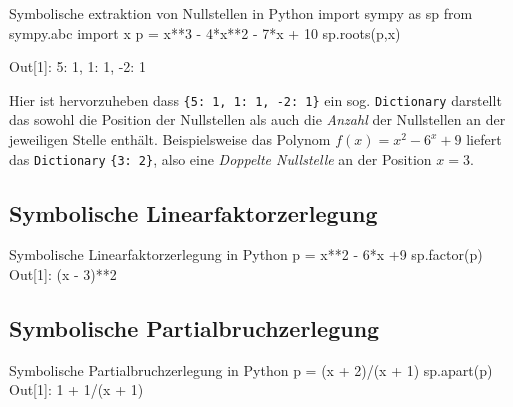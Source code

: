 



\begin{python}{Symbolische extraktion von Nullstellen in Python}
import sympy as sp
from sympy.abc import x
p = x**3 - 4*x**2 - 7*x + 10
sp.roots(p,x)

Out[1]: {5: 1, 1: 1, -2: 1}
\end{python}

Hier ist hervorzuheben dass \texttt{\{5: 1, 1: 1, -2: 1\}} ein sog. \texttt{Dictionary} darstellt das sowohl die Position der Nullstellen als auch die \emph{Anzahl} der Nullstellen an der jeweiligen Stelle enthält. 
Beispielsweise das Polynom $f(x) = x^2 - 6^x + 9$ liefert das \texttt{Dictionary} \texttt{\{3: 2\}}, also eine \emph{Doppelte Nullstelle} an der Position $x=3$. 








\subsection{Symbolische Linearfaktorzerlegung}
\begin{python}{Symbolische Linearfaktorzerlegung in Python}
p = x**2 - 6*x +9
sp.factor(p)
Out[1]: (x - 3)**2
\end{python}


\subsection{Symbolische Partialbruchzerlegung}

\begin{python}{Symbolische Partialbruchzerlegung in Python}
p = (x + 2)/(x + 1)
sp.apart(p)
Out[1]: 1 + 1/(x + 1)
\end{python}




